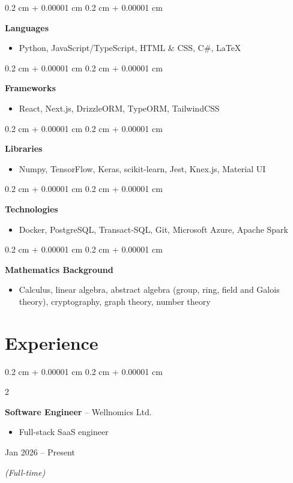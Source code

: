 \documentclass[10pt, letterpaper]{article}
\newenvironment{highlights}{
    \begin{itemize}[
        topsep=0.10 cm,
        parsep=0.10 cm,
        partopsep=0pt,
        itemsep=0pt,
        leftmargin=0.4 cm + 10pt
    ]
}{
    \end{itemize}
} %
\newenvironment{onecolentry}{
    \begin{adjustwidth}{
        0.2 cm + 0.00001 cm
    }{
        0.2 cm + 0.00001 cm
    }
}{
    \end{adjustwidth}
} %
\newenvironment{twocolentry}[2][]{
    \onecolentry
    \def\secondColumn{#2}
    \setcolumnwidth{\fill, 4.5 cm}
    \begin{paracol}{2}
}{
    \switchcolumn \raggedleft \secondColumn
    \end{paracol}
    \endonecolentry
} %
\begin{document}
\begin{onecolentry}
    \textbf{Languages}
    \begin{highlights}
        \item[] Python, JavaScript/TypeScript, HTML \& CSS, C\#, LaTeX
    \end{highlights}
\end{onecolentry}

\begin{onecolentry}
    \textbf{Frameworks}
    \begin{highlights}
        \item[] React, Next.js, DrizzleORM, TypeORM, TailwindCSS
    \end{highlights}
\end{onecolentry}

\begin{onecolentry}
    \textbf{Libraries}
    \begin{highlights}
        \item[] Numpy, TensorFlow, Keras, scikit-learn, Jest, Knex.js, Material UI
    \end{highlights}
\end{onecolentry}

\begin{onecolentry}
    \textbf{Technologies}
    \begin{highlights}
        \item[] Docker, PostgreSQL, Transact-SQL, Git, Microsoft Azure, Apache Spark
    \end{highlights}
\end{onecolentry}

\begin{onecolentry}
    \textbf{Mathematics Background}
    \begin{highlights}
        \item[] Calculus, linear algebra, abstract algebra (group, ring, field and Galois theory), cryptography, graph theory, number theory
    \end{highlights}
\end{onecolentry}

\section{Experience}

\begin{twocolentry}{
        Jan 2026 -- Present

        \textit{(Full-time)}
    }
    \textbf{Software Engineer} -- Wellnomics Ltd.
    \begin{highlights}
        \item Full-stack SaaS engineer
    \end{highlights}
\end{twocolentry}
\end{document}
